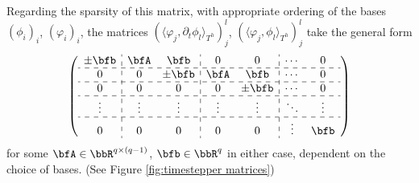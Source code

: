 \begin{example}
        Regarding the sparsity of this matrix, with appropriate ordering of the bases $(\phi_{i})_{i}$, $(\varphi_{i})_{i}$, the matrices $(\langle\varphi_{j}, \partial_{t}\phi_{l}\rangle_{T^{h}})_{j}^{l}$, $(\langle\varphi_{j}, \phi_{l}\rangle_{T^{h}})_{j}^{l}$ take the general form
        \begin{equation}\label{eqn:timestepper matrices}
            \left(\begin{array}{ c : c c : c c : c c }
                \pm\bfb  &  \bfA    &  \bfb     &  0       &  0        &  \cdots   &  0        \\
                \hdashline
                0        &  0       &  \pm\bfb  &  \bfA    &  \bfb     &  \cdots   &  0        \\
                \hdashline
                0        &  0       &  0        &  0       &  \pm\bfb  &  \cdots   &  0        \\
                \hdashline
                \vdots   &  \vdots  &  \vdots   &  \vdots  &  \vdots   &  \ddots   &  \vdots   \\
                \hdashline
                0        &  0       &  0        &  0       &  0        &  \vdots   &  \bfb     \\
            \end{array}\right)
        \end{equation}
        for some $\bfA  \in  \bbR^{q\times (q - 1)}$, $\bfb  \in  \bbR^{q}$ in either case, dependent on the choice of bases. (See Figure \ref{fig:timestepper matrices}) 


\end{example}
